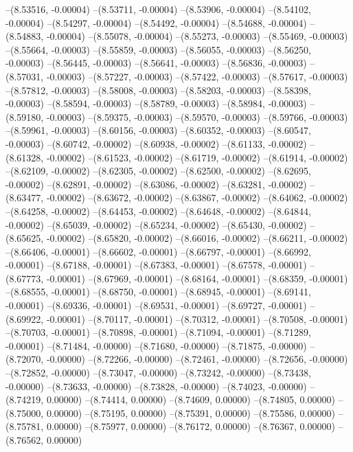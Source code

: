 --(8.53516, -0.00004)
--(8.53711, -0.00004)
--(8.53906, -0.00004)
--(8.54102, -0.00004)
--(8.54297, -0.00004)
--(8.54492, -0.00004)
--(8.54688, -0.00004)
--(8.54883, -0.00004)
--(8.55078, -0.00004)
--(8.55273, -0.00003)
--(8.55469, -0.00003)
--(8.55664, -0.00003)
--(8.55859, -0.00003)
--(8.56055, -0.00003)
--(8.56250, -0.00003)
--(8.56445, -0.00003)
--(8.56641, -0.00003)
--(8.56836, -0.00003)
--(8.57031, -0.00003)
--(8.57227, -0.00003)
--(8.57422, -0.00003)
--(8.57617, -0.00003)
--(8.57812, -0.00003)
--(8.58008, -0.00003)
--(8.58203, -0.00003)
--(8.58398, -0.00003)
--(8.58594, -0.00003)
--(8.58789, -0.00003)
--(8.58984, -0.00003)
--(8.59180, -0.00003)
--(8.59375, -0.00003)
--(8.59570, -0.00003)
--(8.59766, -0.00003)
--(8.59961, -0.00003)
--(8.60156, -0.00003)
--(8.60352, -0.00003)
--(8.60547, -0.00003)
--(8.60742, -0.00002)
--(8.60938, -0.00002)
--(8.61133, -0.00002)
--(8.61328, -0.00002)
--(8.61523, -0.00002)
--(8.61719, -0.00002)
--(8.61914, -0.00002)
--(8.62109, -0.00002)
--(8.62305, -0.00002)
--(8.62500, -0.00002)
--(8.62695, -0.00002)
--(8.62891, -0.00002)
--(8.63086, -0.00002)
--(8.63281, -0.00002)
--(8.63477, -0.00002)
--(8.63672, -0.00002)
--(8.63867, -0.00002)
--(8.64062, -0.00002)
--(8.64258, -0.00002)
--(8.64453, -0.00002)
--(8.64648, -0.00002)
--(8.64844, -0.00002)
--(8.65039, -0.00002)
--(8.65234, -0.00002)
--(8.65430, -0.00002)
--(8.65625, -0.00002)
--(8.65820, -0.00002)
--(8.66016, -0.00002)
--(8.66211, -0.00002)
--(8.66406, -0.00001)
--(8.66602, -0.00001)
--(8.66797, -0.00001)
--(8.66992, -0.00001)
--(8.67188, -0.00001)
--(8.67383, -0.00001)
--(8.67578, -0.00001)
--(8.67773, -0.00001)
--(8.67969, -0.00001)
--(8.68164, -0.00001)
--(8.68359, -0.00001)
--(8.68555, -0.00001)
--(8.68750, -0.00001)
--(8.68945, -0.00001)
--(8.69141, -0.00001)
--(8.69336, -0.00001)
--(8.69531, -0.00001)
--(8.69727, -0.00001)
--(8.69922, -0.00001)
--(8.70117, -0.00001)
--(8.70312, -0.00001)
--(8.70508, -0.00001)
--(8.70703, -0.00001)
--(8.70898, -0.00001)
--(8.71094, -0.00001)
--(8.71289, -0.00001)
--(8.71484, -0.00000)
--(8.71680, -0.00000)
--(8.71875, -0.00000)
--(8.72070, -0.00000)
--(8.72266, -0.00000)
--(8.72461, -0.00000)
--(8.72656, -0.00000)
--(8.72852, -0.00000)
--(8.73047, -0.00000)
--(8.73242, -0.00000)
--(8.73438, -0.00000)
--(8.73633, -0.00000)
--(8.73828, -0.00000)
--(8.74023, -0.00000)
--(8.74219, 0.00000)
--(8.74414, 0.00000)
--(8.74609, 0.00000)
--(8.74805, 0.00000)
--(8.75000, 0.00000)
--(8.75195, 0.00000)
--(8.75391, 0.00000)
--(8.75586, 0.00000)
--(8.75781, 0.00000)
--(8.75977, 0.00000)
--(8.76172, 0.00000)
--(8.76367, 0.00000)
--(8.76562, 0.00000)
